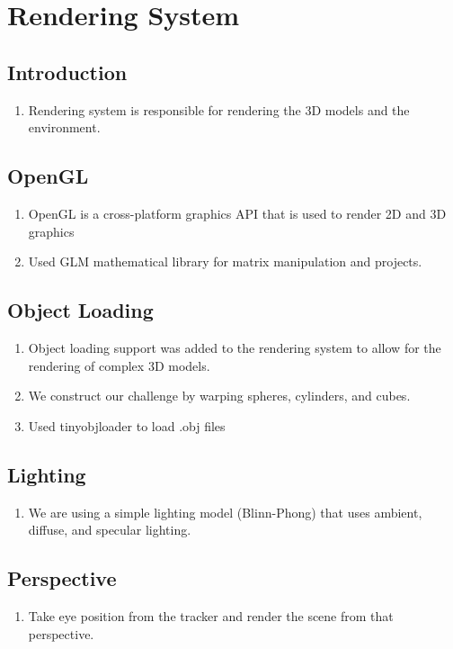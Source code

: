 \section{Rendering System}
\subsection{Introduction}
\begin{enumerate}
	\item Rendering system is responsible for rendering the 3D models and the environment.
\end{enumerate}
\subsection{OpenGL}
\begin{enumerate}
	\item OpenGL is a cross-platform graphics API that is used to render 2D and 3D graphics
	\item Used GLM mathematical library for matrix manipulation and projects.
\end{enumerate}

\subsection{Object Loading}
\begin{enumerate}
	\item Object loading support was added to the rendering system to allow for the rendering of complex 3D models.
	\item We construct our challenge by warping spheres, cylinders, and cubes.
	\item Used tinyobjloader to load .obj files
\end{enumerate}

\subsection{Lighting}
\begin{enumerate}
	\item We are using a simple lighting model (Blinn-Phong) that uses ambient, diffuse, and specular lighting.
\end{enumerate}

\subsection{Perspective}
\begin{enumerate}
	\item Take eye position from the tracker and render the scene from that perspective.
\end{enumerate}
